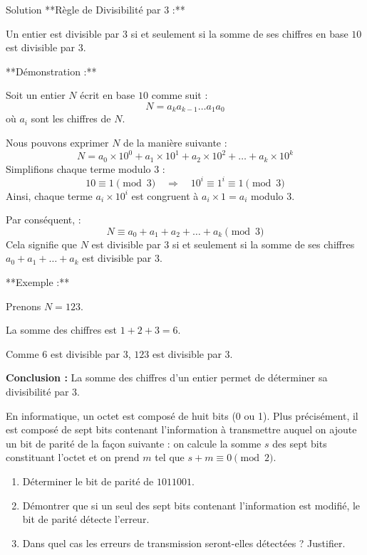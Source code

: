 \documentclass[a4paper,12pt]{article}
\begin{document}
\begin{solutionbox}{Solution}
**Règle de Divisibilité par 3 :**

Un entier est divisible par \( 3 \) si et seulement si la somme de ses chiffres en base \( 10 \) est divisible par \( 3 \).

**Démonstration :**

Soit un entier \( N \) écrit en base \( 10 \) comme suit :
\[
N = a_k a_{k-1} \dots a_1 a_0
\]
où \( a_i \) sont les chiffres de \( N \).

Nous pouvons exprimer \( N \) de la manière suivante :
\[
N = a_0 \times 10^0 + a_1 \times 10^1 + a_2 \times 10^2 + \dots + a_k \times 10^k
\]
Simplifions chaque terme modulo \( 3 \) :
\[
10 \equiv 1 \pmod{3} \quad \Rightarrow \quad 10^i \equiv 1^i \equiv 1 \pmod{3}
\]
Ainsi, chaque terme \( a_i \times 10^i \) est congruent à \( a_i \times 1 = a_i \) modulo \( 3 \).

Par conséquent, :
\[
N \equiv a_0 + a_1 + a_2 + \dots + a_k \pmod{3}
\]
Cela signifie que \( N \) est divisible par \( 3 \) si et seulement si la somme de ses chiffres \( a_0 + a_1 + \dots + a_k \) est divisible par \( 3 \).

**Exemple :**

Prenons \( N = 123 \).

La somme des chiffres est \( 1 + 2 + 3 = 6 \).

Comme \( 6 \) est divisible par \( 3 \), \( 123 \) est divisible par \( 3 \).

\textbf{Conclusion :} La somme des chiffres d'un entier permet de déterminer sa divisibilité par \( 3 \).
\end{solutionbox}

\begin{exercice}[title=Exercice 7 $\quad \star \star \quad$ { [Communiquer, Démontrer] }]
En informatique, un octet est composé de huit bits (0 ou 1). Plus précisément, il est composé de sept bits contenant l’information à transmettre auquel on ajoute un bit de parité de la façon suivante : on calcule la somme \( s \) des sept bits constituant l’octet et on prend \( m \) tel que \( s + m \equiv 0 \pmod{2} \).

\begin{enumerate}
    \item Déterminer le bit de parité de \( 1011001 \).
    \item Démontrer que si un seul des sept bits contenant l’information est modifié, le bit de parité détecte l’erreur.
    \item Dans quel cas les erreurs de transmission seront-elles détectées ? Justifier.
\end{enumerate}
\end{exercice}
\end{document}
